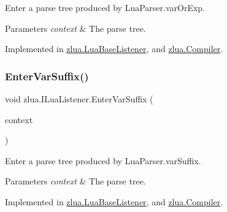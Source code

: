 Enter a parse tree produced by Lua\+Parser.\+var\+Or\+Exp. 


\begin{DoxyParams}{Parameters}
{\em context} & The parse tree.\\
\hline
\end{DoxyParams}


Implemented in \mbox{\hyperlink{classzlua_1_1_lua_base_listener_a0af6c7cb47cd8734025f965a6817bf12}{zlua.\+Lua\+Base\+Listener}}, and \mbox{\hyperlink{classzlua_1_1_compiler_ab7d4a2ccfca5f520e9702eaccab9872b}{zlua.\+Compiler}}.

\mbox{\label{interfacezlua_1_1_i_lua_listener_ad0b34682777b85c6d6fef1d0488b32a4}} 
\subsubsection{\texorpdfstring{Enter\+Var\+Suffix()}{EnterVarSuffix()}}
{\footnotesize\ttfamily void zlua.\+I\+Lua\+Listener.\+Enter\+Var\+Suffix (\begin{DoxyParamCaption}\item[{\mbox{[}\+Not\+Null\mbox{]} \mbox{\hyperlink{classzlua_1_1_lua_parser_1_1_var_suffix_context}{Lua\+Parser.\+Var\+Suffix\+Context}}}]{context }\end{DoxyParamCaption})}



Enter a parse tree produced by Lua\+Parser.\+var\+Suffix. 


\begin{DoxyParams}{Parameters}
{\em context} & The parse tree.\\
\hline
\end{DoxyParams}


Implemented in \mbox{\hyperlink{classzlua_1_1_lua_base_listener_a743b7d8c5cc407d89b015a99597e711b}{zlua.\+Lua\+Base\+Listener}}, and \mbox{\hyperlink{classzlua_1_1_compiler_a6d026840f7eb9bbbdbc9b279c5929e86}{zlua.\+Compiler}}.

\mbox{\label{interfacezlua_1_1_i_lua_listener_abc1fb6386fa985aa88c2813bc1040876}} 
